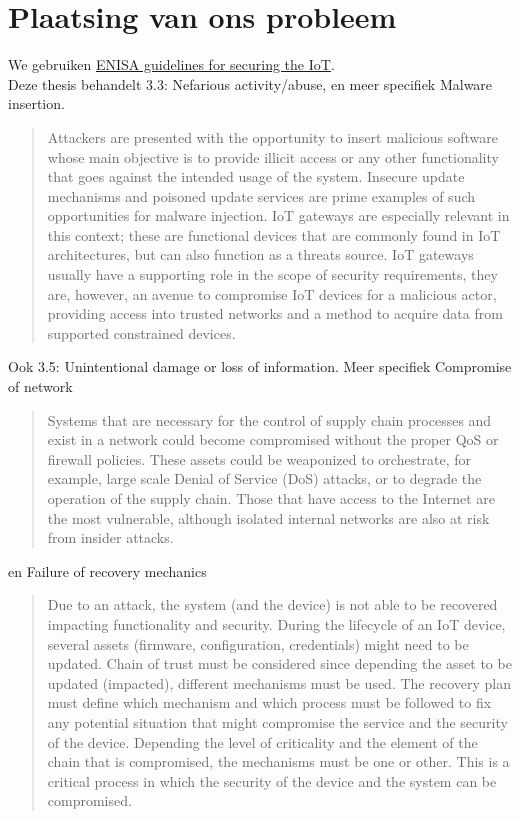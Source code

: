 \section{Plaatsing van ons probleem}
We gebruiken \hyperlink{https://www.enisa.europa.eu/sites/default/files/publications/ENISA\%20Report\%20-\%20Guidelines\%20for\%20Securing\%20the\%20Internet\%20of\%20Things.pdf}{ENISA guidelines for securing the IoT}. \\
Deze thesis behandelt 3.3: Nefarious activity/abuse, en meer specifiek Malware insertion. 
\begin{quote}
    Attackers are presented with the opportunity to insert malicious software
whose main objective is to provide illicit access or any other functionality
that goes against the intended usage of the system. Insecure update
mechanisms and poisoned update services are prime examples of such
opportunities for malware injection. IoT gateways are especially relevant in
this context; these are functional devices that are commonly found in IoT
architectures, but can also function as a threats source. IoT gateways
usually have a supporting role in the scope of security requirements, they
are, however, an avenue to compromise IoT devices for a malicious actor,
providing access into trusted networks and a method to acquire data from
supported constrained devices.
\end{quote}
Ook 3.5: Unintentional damage or loss of information. Meer specifiek Compromise of network \begin{quote}
    Systems that are necessary for the control of supply chain processes and
exist in a network could become compromised without the proper QoS or
firewall policies. These assets could be weaponized to orchestrate, for
example, large scale Denial of Service (DoS) attacks, or to degrade the
operation of the supply chain. Those that have access to the Internet are
the most vulnerable, although isolated internal networks are also at risk
from insider attacks.
\end{quote}
en Failure of recovery mechanics \begin{quote}
    Due to an attack, the system (and the device) is not able to be recovered
impacting functionality and security. During the lifecycle of an IoT device,
several assets (firmware, configuration, credentials) might need to be
updated. Chain of trust must be considered since depending the asset to
be updated (impacted), different mechanisms must be used. The recovery
plan must define which mechanism and which process must be followed to
fix any potential situation that might compromise the service and the
security of the device. Depending the level of criticality and the element of
the chain that is compromised, the mechanisms must be one or other. This
is a critical process in which the security of the device and the system can
be compromised.
\end{quote}
